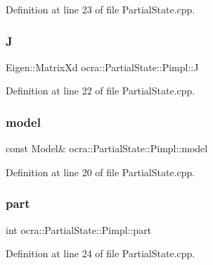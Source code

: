 Definition at line 23 of file Partial\+State.\+cpp.

\hypertarget{structocra_1_1PartialState_1_1Pimpl_a7c31cf81faa6abbbe780b9f143094418}{}\label{structocra_1_1PartialState_1_1Pimpl_a7c31cf81faa6abbbe780b9f143094418} 
\subsubsection{\texorpdfstring{J}{J}}
{\footnotesize\ttfamily Eigen\+::\+Matrix\+Xd ocra\+::\+Partial\+State\+::\+Pimpl\+::J}



Definition at line 22 of file Partial\+State.\+cpp.

\hypertarget{structocra_1_1PartialState_1_1Pimpl_a45e5572b9e9cbe6ac2d9ba4107a58bd6}{}\label{structocra_1_1PartialState_1_1Pimpl_a45e5572b9e9cbe6ac2d9ba4107a58bd6} 
\subsubsection{\texorpdfstring{model}{model}}
{\footnotesize\ttfamily const Model\& ocra\+::\+Partial\+State\+::\+Pimpl\+::model}



Definition at line 20 of file Partial\+State.\+cpp.

\hypertarget{structocra_1_1PartialState_1_1Pimpl_a605a55abed1d170fa6911088fefa7337}{}\label{structocra_1_1PartialState_1_1Pimpl_a605a55abed1d170fa6911088fefa7337} 
\subsubsection{\texorpdfstring{part}{part}}
{\footnotesize\ttfamily int ocra\+::\+Partial\+State\+::\+Pimpl\+::part}



Definition at line 24 of file Partial\+State.\+cpp.

\hypertarget{structocra_1_1PartialState_1_1Pimpl_ac60f12a932c9bac309b2c1794de57a9c}{}\label{structocra_1_1PartialState_1_1Pimpl_ac60f12a932c9bac309b2c1794de57a9c} 
